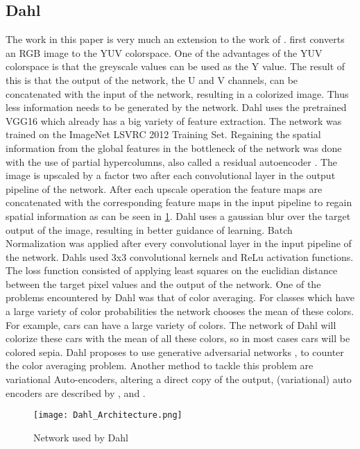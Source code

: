 \subsection{Dahl}
The work in this paper is very much an extension to the work of \cite{Dahl}. \cite{Dahl} first converts an RGB image to the YUV colorspace. One of the advantages of the YUV colorspace is that the greyscale values can be used as the Y value. The result of this is that the output of the network, the U and V channels, can be concatenated with the input of the network, resulting in a colorized image. Thus less information needs to be generated by the network. Dahl uses the pretrained VGG16 which already has a big variety of feature extraction. The network was trained on the ImageNet LSVRC 2012 Training Set. Regaining the spatial information from the global features in the bottleneck of the network was done with the use of partial hypercolumns, also called a residual autoencoder \cite{hariharan2015hypercolumns}. The image is upscaled by a factor two after each convolutional layer in the output pipeline of the network. After each upscale operation the feature maps are concatenated with the corresponding feature maps in the input pipeline to regain spatial information as can be seen in \ref{fig:dahlnetwork}. Dahl uses a gaussian blur over the target output of the image, resulting in better guidance of learning. Batch Normalization was applied after every convolutional layer in the input pipeline of the network. Dahls used 3x3 convolutional kernels and ReLu activation functions. The loss function consisted of applying least squares on the euclidian distance between the target pixel values and the output of the network. One of the problems encountered by Dahl was that of color averaging. For classes which have a large variety of color probabilities the network chooses the mean of these colors. For example, cars can have a large variety of colors. The network of Dahl will colorize these cars with the mean of all these colors, so in most cases cars will be colored sepia. Dahl proposes to use generative adversarial networks \cite{Radford}, to counter the color averaging problem. Another method to tackle this problem are variational Auto-encoders, altering a direct copy of the output, (variational) auto encoders are described by \cite{Gregor}, \cite{Kingma} and \cite{GoodfellowBOOK}. 

\begin{figure}
\centering
\texttt{[image: Dahl\_Architecture.png]}
\caption{Network used by Dahl \cite{Dahl}}
\label{fig:dahlnetwork}
\end{figure}

